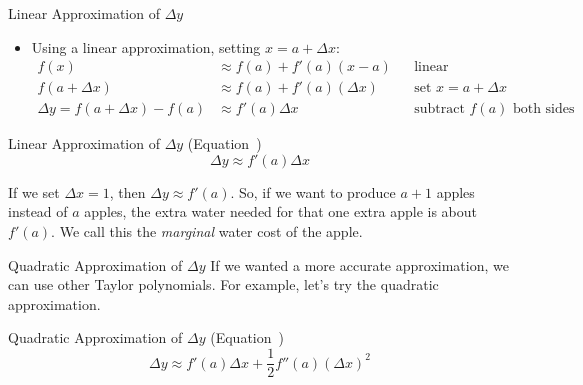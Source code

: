 \begin{frame}[t]{Linear Approximation of $\Delta y$}
\begin{itemize}
\item Using a linear approximation, setting $x=a+\Delta x$:\pause
\begin{align*}
f(x)&\approx f(a)+f'(a)(x-a) && \mbox{linear approximation}\\
f(a+\Delta x)&\approx f(a)+f'(a)(\Delta x) && \mbox{set $x=a+\Delta x$}\\
\Delta y = f(a+\Delta x)-f(a) & \approx  f'(a)\Delta x &&\mbox{subtract $f(a)$ both sides}
\end{align*}
\end{itemize}\pause\vfill
\begin{block}{Linear Approximation of $\Delta y$ (Equation~)}
\[\Delta y \approx f'(a) \Delta x\]
\end{block}\pause\vfill
If we set $\Delta x=1$, then $\Delta y \approx f'(a)$. So, if we want to produce $a+1$ apples instead of $a$ apples, the extra water needed for that one extra apple is about $f'(a)$. We call this the \textit{marginal} water cost of the apple.
\end{frame}
\begin{frame}[t]{Quadratic Approximation of $\Delta y$}
If we wanted a more accurate approximation, we can use other Taylor polynomials. For example, let's try the quadratic approximation.\pause

\begin{block}{Quadratic Approximation of $\Delta y$ (Equation~)}
\[\Delta y \approx  f'(a)\Delta x+\frac12f''(a)(\Delta x)^2\]
\end{block}\vfill
\end{frame}

